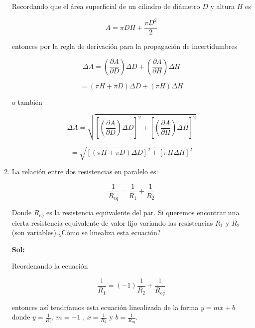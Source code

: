 \documentclass[12pt,a4paper]{article}
\begin{document}
\begin{enumerate}
Recordando que el área superficial de un cilindro de diámetro $D$ y altura $H$ es

\begin{equation*}
    A = \pi D H + \frac{\pi D^2}{2}
\end{equation*}

entonces por la regla de derivación para la propagación de incertidumbres

\begin{equation*}
    \Delta A = \left(\frac{\partial A}{\partial D}\right) \Delta D + \left(\frac{\partial A}{\partial H}\right) \Delta H
\end{equation*}

\begin{equation*}
    = (\pi H + \pi D) \Delta D + (\pi H) \Delta H
\end{equation*}

o también

\begin{equation*}
    \Delta A = \sqrt{\left[\left(\frac{\partial A}{\partial D}\right) \Delta D\right]^2 + \left[\left(\frac{\partial A}{\partial H}\right) \Delta H\right]^2}
\end{equation*}

\begin{equation*}
    = \sqrt{\left[ (\pi H + \pi D) \Delta D\right]^2 + \left[\pi H \Delta H\right]^2}
\end{equation*}






\item La relación entre dos resistencias en paralelo es:

\begin{equation*}
    \frac{1}{R_{eq}} = \frac{1}{R_1} + \frac{1}{R_2}
\end{equation*}

Donde $R_{eq}$ es la resistencia equivalente del par. Si queremos encontrar una cierta resistencia equivalente de valor fijo variando las resistencias $R_1$ y $R_2$ (son variables).¿Cómo se linealiza esta ecuación?

\textbf{Sol:}

Reordenando la ecuación

\begin{equation*}
    \frac{1}{R_1} = (-1)\frac{1}{R_2} + \frac{1}{R_{eq}}
\end{equation*}

entonces así tendríamos esta ecuación linealizada de la forma $y = mx + b$ donde $y = \frac{1}{R_1}$, $m = -1$ , $x= \frac{1}{R_2}$ y $b = \frac{1}{R_{eq}}$.





\end{enumerate}
\end{document}
